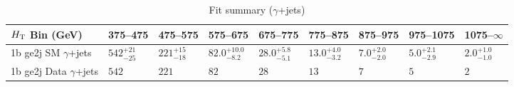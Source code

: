 \documentclass[8pt]{article}
\def\scalht{\mbox{$H_{\rm{T}}$}\xspace}
\newcommand\T{\rule{0pt}{2.6ex}}
\begin{document}
\begin{table}[ht!]
\caption{Fit summary ($\gamma$+jets)}
\label{tab:ensemble-summary}
\centering
\begin{tabular}{ lllllllll }

\hline
\scalht Bin (GeV)       & 375--475                       & 475--575                       & 575--675                       & 675--775                       & 775--875                       & 875--975                       & 975--1075                      & 1075--$\infty$                 \\ [1.000000ex]
\hline
1b ge2j SM $\gamma$+jets\T & $542^{+21}_{-25}$              & $221^{+15}_{-18}$              & $82.0^{+10.0}_{-8.2}$          & $28.0^{+5.8}_{-5.1}$           & $13.0^{+4.0}_{-3.2}$           & $7.0^{+2.0}_{-2.0}$            & $5.0^{+2.1}_{-2.9}$            & $2.0^{+1.0}_{-1.0}$            \\ 
1b ge2j Data $\gamma$+jets\T & $542$                          & $221$                          & $82$                           & $28$                           & $13$                           & $7$                            & $5$                            & $2$                            \\ 
\hline

\end{tabular}
\end{table}
\end{document}
